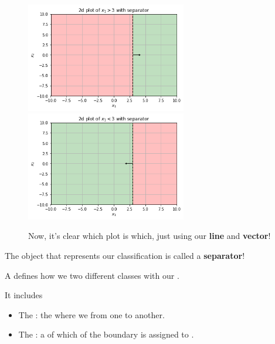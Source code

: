         \begin{figure}[H]
                \includegraphics[width=70mm,scale=0.5]{images/classification_images/x1_2d_plot_separator.png}
                \includegraphics[width=70mm,scale=0.5]{images/classification_images/x1_2d_plot_separator_reversed.png}
                
                \caption*{Now, it's clear which plot is which, just using our \textbf{line} and \textbf{vector}!}
        \end{figure}
        
        The object that represents our classification is called a \textbf{separator}!
            \\
            
        \begin{definition}
            A  defines how we  two different classes with our .
            
            It includes
            
            \begin{itemize}
                \item The : the  where we  from one  to another.
                \item The : a  of which  of the boundary is assigned to .
            \end{itemize}
        \end{definition}
        
